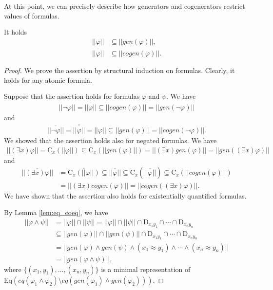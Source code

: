 \documentclass{lmcs}
\def\tu#1{( #1)}
\def\C{\textrm{C}}
\def\D{\textrm{D}}
\def\eq{eq}
\def\Eq{{\textrm{Eq}}}
\def\gen{gen}
\def\cogen{cogen}
\begin{document}
At this point, we can precisely describe how generators and cogenerators restrict values of formulas.
\begin{thm}\label{thm:gen}
It holds
\begin{align*}
||\varphi||&\subseteq||\gen(\varphi)||,\\
\overline{||\varphi||}&\subseteq||\cogen(\varphi)||. 
\end{align*}
 \end{thm} 
\begin{proof}
We prove the assertion by structural induction on formulas. Clearly, it holds for any atomic formula. 

Suppose that the assertion holds for formulas $\varphi$ and $\psi$. We have 
\begin{align*}
||\neg\varphi||=\overline{||\varphi||}\subseteq||\cogen(\varphi)||=||\gen(\neg\varphi)||
\end{align*}
and
\begin{align*}
\overline{||\neg\varphi||}=\overline{\overline{||\varphi||}}=||\varphi||\subseteq||\gen(\varphi)||=||\cogen(\neg\varphi)||. 
\end{align*}
We showed that the assertion holds also for negated formulas. We have
\begin{align*}
||(\exists x)\varphi||=\C_x(||\varphi||)\subseteq\C_x(||\gen(\varphi)||)=||(\exists x)\gen(\varphi)||=||\gen((\exists x)\varphi)||
\end{align*}
and
\begin{align*}
\overline{||(\exists x)\varphi||}&=\overline{\C_x(||\varphi||)}\subseteq\overline{||\varphi||}\subseteq\C_x(\overline{||\varphi||})\subseteq\C_x(||\cogen(\varphi)||)\\
&=||(\exists x)\cogen(\varphi)||=||\cogen((\exists x)\varphi)||.
\end{align*}
We have shown that the assertion also holds for existentially quantified formulas.

By Lemma \ref{lem:eq_coeq}, we have
\begin{align*}
||\varphi\wedge\psi||&=||\varphi||\cap||\psi||=||\varphi||\cap||\psi||\cap\D_{x_1y_1}\cap\cdots\cap\D_{x_ny_n}\\
&\subseteq||\gen(\varphi)||\cap||\gen(\psi)||\cap\D_{x_1y_1}\cap\cdots\cap\D_{x_ny_n}\\
&=||\gen(\varphi)\wedge\gen(\psi)\wedge(x_1\approx y_1)\wedge\cdots\wedge (x_n\approx y_n)||\\
&=||\gen(\varphi\wedge\psi)||,
\end{align*}
 where $\{\tu{x_1,y_1},\ldots,\tu{x_n,y_n}\}$ is a minimal representation of $\Eq(\eq(\varphi_1\wedge\varphi_2)\setminus\eq(\gen(\varphi_1)\wedge\gen(\varphi_2)))$.


\end{proof}
\end{document}

